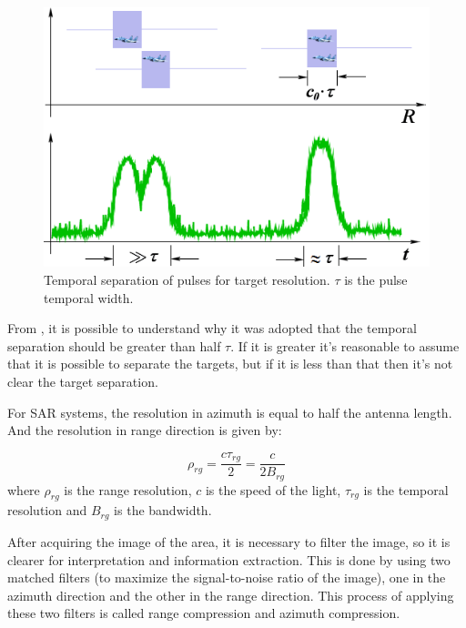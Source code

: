 \begin{figure}[H]
    \centering
    \includegraphics[width=0.8\linewidth]{Cap1/ra1_print.png}
    \caption{Temporal separation of pulses for target resolution. $\tau$ is the pulse temporal width.}
    \label{fig:pulse_separation}
\end{figure}{}

From , it is possible to understand why it was adopted that the temporal separation should be greater than half $\tau$. If it is greater it's reasonable to assume that it is possible to separate the targets, but if it is less than that then it's not clear the target separation.

For SAR systems, the resolution in azimuth is equal to half the antenna length. And the resolution in range direction is given by: 

\begin{equation}
    \rho_{rg} = \frac{c\tau_{rg}}{2} = \frac{c}{2B_{rg}}
\end{equation}
where $\rho_{rg}$ is the range resolution, $c$ is the speed of the light, $\tau_{rg}$ is the temporal resolution and $B_{rg}$ is the bandwidth.

After acquiring the image of the area, it is necessary to filter the image, so it is clearer for interpretation and information extraction. This is done by using two matched filters (to maximize the signal-to-noise ratio of the image), one in the azimuth direction and the other in the range direction. 
This process of applying these two filters is called range compression and azimuth compression.

